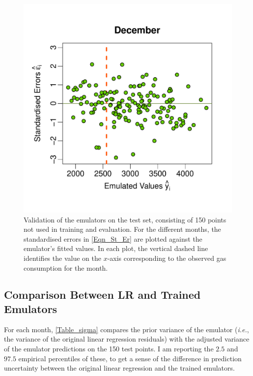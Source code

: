 \documentclass[a4paper, 12pt]{article}
\newcommand{\ie}{\textit{i.e.}}
\begin{document}
\begin{figure}
 \includegraphics[width=\scale]{Validation_Plots/Test_Set/Test_Scatter_12_Dec}
\caption{Validation of the emulators on the test set, consisting of 150 points not used in training and evaluation. For the different months, the standardised errors in \eqref{Eqn_St_Er} are plotted against the emulator's fitted values. In each plot, the vertical dashed line identifies the value on the $x$-axis corresponding to the observed gas consumption for the month.}
 \label{Fig_Scatter_Errors_Test}
\end{figure}


\subsection{Comparison Between LR and Trained Emulators}

For each month, \autoref{Table_sigma} compares the prior variance of the emulator (\ie, the variance of the original linear regression residuals) with the adjusted variance of the emulator predictions on the 150 test points. I am reporting the $2.5$ and $97.5$ empirical percentiles of these, to get a sense of the difference in prediction uncertainty between the original linear regression and the trained emulators.
\end{document}
